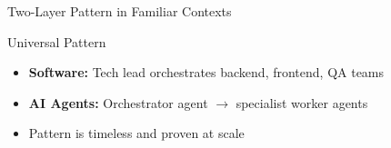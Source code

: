 \documentclass[aspectratio=169,11pt]{beamer}
\begin{document}
\begin{frame}{Two-Layer Pattern in Familiar Contexts}
\vspace{0.4cm}
\begin{block}{Universal Pattern}
\begin{itemize}
    \item \textbf{Software:} Tech lead orchestrates backend, frontend, QA teams
    \item \textbf{AI Agents:} Orchestrator agent $\rightarrow$ specialist worker agents
    \item Pattern is timeless and proven at scale
\end{itemize}
\end{block}
\end{frame}

\end{document}
